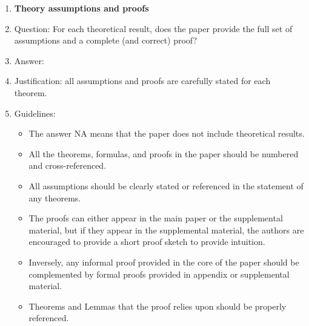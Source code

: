 \documentclass{article}
\theoremstyle{plain}
\theoremstyle{definition}
\theoremstyle{remark}
\begin{document}
\begin{enumerate}
\item {\bf Theory assumptions and proofs}
    \item[] Question: For each theoretical result, does the paper provide the full set of assumptions and a complete (and correct) proof?
    \item[] Answer: \answerYes{} %
    \item[] Justification: all assumptions and proofs are carefully stated for each theorem.
    \item[] Guidelines:
    \begin{itemize}
        \item The answer NA means that the paper does not include theoretical results. 
        \item All the theorems, formulas, and proofs in the paper should be numbered and cross-referenced.
        \item All assumptions should be clearly stated or referenced in the statement of any theorems.
        \item The proofs can either appear in the main paper or the supplemental material, but if they appear in the supplemental material, the authors are encouraged to provide a short proof sketch to provide intuition. 
        \item Inversely, any informal proof provided in the core of the paper should be complemented by formal proofs provided in appendix or supplemental material.
        \item Theorems and Lemmas that the proof relies upon should be properly referenced. 
    \end{itemize}


\end{enumerate}
\end{document}
